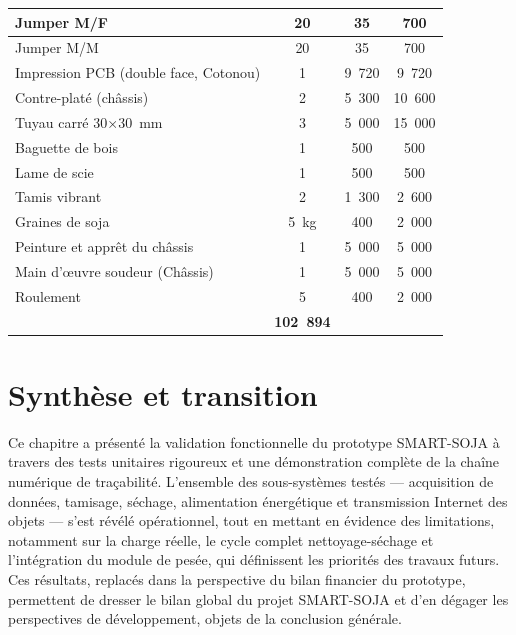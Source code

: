 \begin{longtable}{|p{7.2cm}|c|c|c|}
Jumper M/F & 20 & 35 & 700 \\ \hline
Jumper M/M & 20 & 35 & 700 \\ \hline
Impression PCB (double face, Cotonou) & 1 & 9~720 & 9~720 \\ \hline
Contre-platé (châssis) & 2 & 5~300 & 10~600 \\ \hline
Tuyau carré 30×30~mm & 3 & 5~000 & 15~000 \\ \hline
Baguette de bois & 1 & 500 & 500 \\ \hline
Lame de scie & 1 & 500 & 500 \\ \hline
Tamis vibrant & 2 & 1~300 & 2~600 \\ \hline
Graines de soja & 5~kg & 400 & 2~000 \\ \hline
Peinture et apprêt du châssis & 1 & 5~000 & 5~000 \\ \hline
Main d'œuvre soudeur (Châssis) & 1 & 5~000 & 5~000 \\ \hline
Roulement & 5 & 400 & 2~000 \\ \hline
\rowcolor{lightGray}
\multicolumn{3}{|r|}{\textbf{TOTAL GÉNÉRAL}} & \textbf{102~894} \\
\end{longtable}

\section*{Synthèse et transition}
Ce chapitre a présenté la validation fonctionnelle du prototype SMART-SOJA à travers des tests unitaires rigoureux et une démonstration complète de la chaîne numérique de traçabilité. L'ensemble des sous-systèmes testés — acquisition de données, tamisage, séchage, alimentation énergétique et transmission Internet des objets — s'est révélé opérationnel, tout en mettant en évidence des limitations, notamment sur la charge réelle, le cycle complet nettoyage-séchage et l'intégration du module de pesée, qui définissent les priorités des travaux futurs. Ces résultats, replacés dans la perspective du bilan financier du prototype, permettent de dresser le bilan global du projet SMART-SOJA et d'en dégager les perspectives de développement, objets de la conclusion générale.
